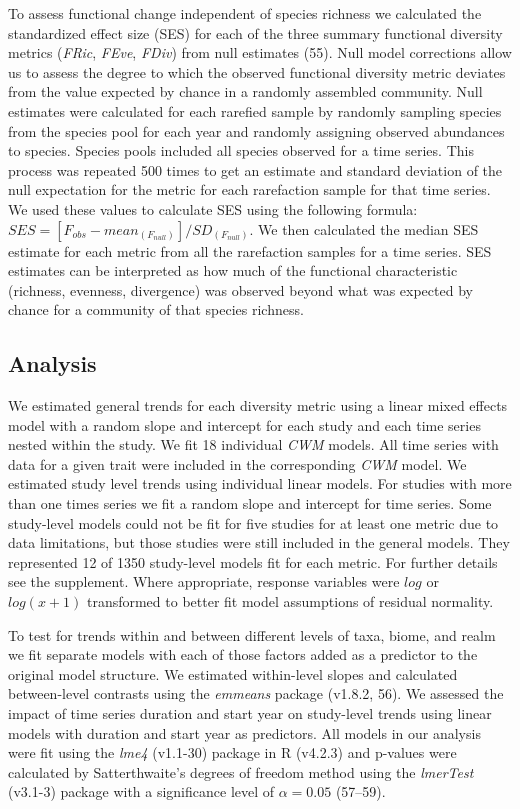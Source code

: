 \documentclass{article}
\begin{document}
To assess functional change independent of species richness we
calculated the standardized effect size (SES) for each of the three
summary functional diversity metrics (\emph{FRic}, \emph{FEve},
\emph{FDiv}) from null estimates (55). Null model corrections allow us
to assess the degree to which the observed functional diversity metric
deviates from the value expected by chance in a randomly assembled
community. Null estimates were calculated for each rarefied sample by
randomly sampling species from the species pool for each year and
randomly assigning observed abundances to species. Species pools
included all species observed for a time series. This process was
repeated 500 times to get an estimate and standard deviation of the null
expectation for the metric for each rarefaction sample for that time
series. We used these values to calculate SES using the following
formula: \(SES = [F_{obs} - mean_{(F_{null})}]/SD_{(F_{null})}\). We
then calculated the median SES estimate for each metric from all the
rarefaction samples for a time series. SES estimates can be interpreted
as how much of the functional characteristic (richness, evenness,
divergence) was observed beyond what was expected by chance for a
community of that species richness.

\hypertarget{analysis}{%
\subsection{Analysis}\label{analysis}}

We estimated general trends for each diversity metric using a linear
mixed effects model with a random slope and intercept for each study and
each time series nested within the study. We fit 18 individual
\emph{CWM} models. All time series with data for a given trait were
included in the corresponding \emph{CWM} model. We estimated study level
trends using individual linear models. For studies with more than one
times series we fit a random slope and intercept for time series. Some
study-level models could not be fit for five studies for at least one
metric due to data limitations, but those studies were still included in
the general models. They represented 12 of 1350 study-level models fit
for each metric. For further details see the supplement. Where
appropriate, response variables were \(log\) or \(log(x+1)\) transformed
to better fit model assumptions of residual normality.

To test for trends within and between different levels of taxa, biome,
and realm we fit separate models with each of those factors added as a
predictor to the original model structure. We estimated within-level
slopes and calculated between-level contrasts using the \emph{emmeans}
package (v1.8.2, 56). We assessed the impact of time series duration and
start year on study-level trends using linear models with duration and
start year as predictors. All models in our analysis were fit using the
\emph{lme4} (v1.1-30) package in R (v4.2.3) and p-values were calculated
by Satterthwaite's degrees of freedom method using the \emph{lmerTest}
(v3.1-3) package with a significance level of \(\alpha = 0.05\)
(57--59).
\end{document}
